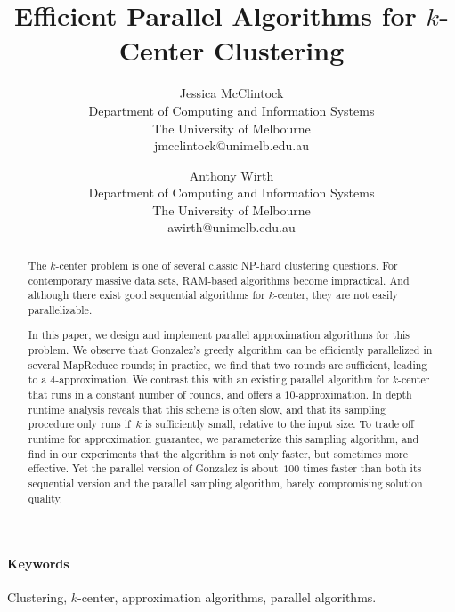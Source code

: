 \documentclass[11pt]{article}
\begin{document}
\title{\Large Efficient Parallel Algorithms for $k$-Center Clustering}

\author{Jessica McClintock\\
{Department of Computing and Information Systems}\\
{The University of Melbourne}\\
{jmcclintock@unimelb.edu.au}
\and 
Anthony Wirth\\
{Department of Computing and Information Systems}\\
{The University of Melbourne}\\
awirth@unimelb.edu.au
}
\date{}
\maketitle



\begin{abstract} 
The $k$-center problem is one of several classic NP-hard clustering questions.
For contemporary massive data sets, RAM-based algorithms become impractical.
And although there exist good sequential algorithms for $k$-center, they are not easily parallelizable.

In this paper, we design and implement parallel approximation algorithms for
this problem.
We observe that Gonzalez's greedy algorithm can be efficiently parallelized in
several MapReduce rounds; in practice, we find that two rounds are sufficient,
leading to a $4$-approximation.
We contrast this with an existing parallel algorithm for $k$-center that runs
in a constant number of rounds, and offers a $10$-approximation.
In depth runtime analysis reveals that this scheme is often slow, and that its
sampling procedure only runs if~$k$ is sufficiently small, relative to the
input size.
To trade off runtime for approximation guarantee, we parameterize this
sampling algorithm, and find in our experiments that the algorithm is not only
faster, but sometimes more effective.
Yet the parallel version of Gonzalez is about~$100$ times faster than both its
sequential version and the parallel sampling algorithm, barely compromising
solution quality.
\end{abstract}


\medskip
\paragraph*{Keywords}
\noindent
Clustering, $k$-center, approximation algorithms, parallel algorithms.
 
\end{document}
